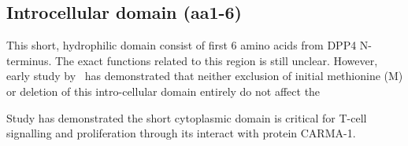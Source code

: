 \subsection{Introcellular domain (aa1-6)}

This short, hydrophilic domain consist of first 6 amino acids from DPP4 N-terminus. The exact functions related to this region is still unclear. However, early study by~\citet{Hong1990} has demonstrated that neither exclusion of initial methionine (M) or deletion of this intro-cellular domain entirely do not affect the 

Study has demonstrated the short cytoplasmic domain is critical for T-cell signalling and proliferation through its interact with protein CARMA-1. \cite{Ohnuma_2007}